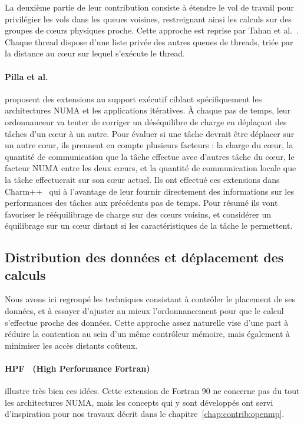 La deuxième partie de leur contribution consiste à étendre le vol de travail pour privilégier les vols dans les queues voisines, restreignant ainsi les calculs sur des groupes de cœurs physiques proche.
Cette approche est reprise par Tahan et al.~\cite{Tahan2014}. Chaque thread dispose d'une liste privée des autres queues de threads, triée par la distance au cœur sur lequel s'exécute le thread.



\paragraph{Pilla et al.~\cite{Pilla2014}} proposent des extensions au support exécutif ciblant spécifiquement les architectures NUMA et les applications itératives.
À chaque pas de temps, leur ordonnanceur va tenter de corriger un déséquilibre de charge en déplaçant des tâches d'un cœur à un autre.
Pour évaluer si une tâche devrait être déplacer sur un autre cœur, ils prennent en compte plusieurs facteurs : la charge du cœur, la quantité de communication que la tâche effectue avec d'autres tâche du cœur, le facteur NUMA entre les deux cœurs, et la quantité de communication locale que la tâche effectuerait sur son cœur actuel.
Ils ont effectué ces extensions dans Charm++~\cite{Kale1993} qui à l'avantage de leur fournir directement des informations sur les performances des tâches aux précédents pas de temps.
Pour résumé ils vont favoriser le rééquilibrage de charge sur des cœurs voisins, et considérer un équilibrage sur un cœur distant si les caractéristiques de la tâche le permettent.


\subsection{Distribution des données et déplacement des calculs}

Nous avons ici regroupé les techniques consistant à contrôler le placement de ses données, et à essayer d'ajuster au mieux l'ordonnancement pour que le calcul s'effectue proche des données.
Cette approche assez naturelle vise d'une part à réduire la contention au sein d'un même contrôleur mémoire, mais également à minimiser les accès distants coûteux.

\paragraph{HPF~\cite{HPF} (High Performance Fortran)} illustre très bien ces idées.
Cette extension de Fortran 90 ne concerne pas du tout les architectures NUMA, mais les concepts qui y sont développés ont servi d'inspiration pour nos travaux décrit dans le chapitre~\ref{chap:contrib:openmp}.

